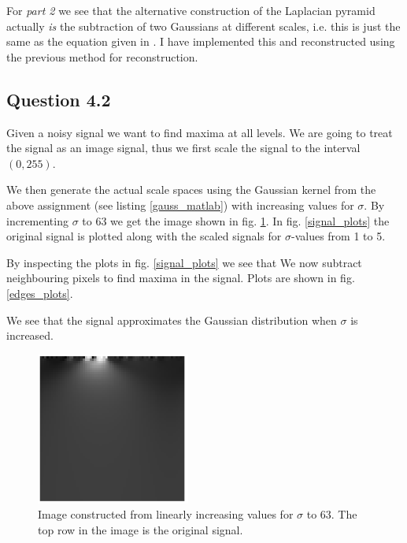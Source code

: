 \documentclass[a4paper, 10pt, final]{article}
\begin{document}
For \emph{part 2} we see that the alternative construction of the
Laplacian pyramid actually \emph{is} the subtraction of two Gaussians
at different scales, i.e. this is just the same as the equation given in
\citep[exercise 5.3]{jahne-digital}. I have implemented this and
reconstructed using the previous method for reconstruction.

\subsection*{Question 4.2}
Given a noisy signal we want to find maxima at all levels. We are
going to treat the signal as an image signal, thus we first scale the
signal to the interval $(0, 255)$.

We then generate the actual scale spaces using the Gaussian kernel from
the above assignment (see listing \ref{gauss_matlab}) with increasing
values for $\sigma$. By incrementing $\sigma$ to 63 we get the image
shown in fig. \ref{signal_image}. In fig. \ref{signal_plots} the
original signal is plotted along with the scaled signals for
$\sigma$-values from 1 to 5.

By inspecting the plots in fig. \ref{signal_plots} we see that
We now subtract neighbouring pixels to find maxima in the signal. Plots
are shown in fig. \ref{edges_plots}.

We see that the signal approximates the Gaussian distribution when
$\sigma$ is increased.

\begin{figure}[!h]
    \centering
    \includegraphics[angle=0,width=0.45\textwidth]{images/signal_image}
    \caption{Image constructed from linearly increasing values for
    $\sigma$ to 63. The top row in the image is the original signal.}
    \label{signal_image}
\end{figure}
\end{document}
